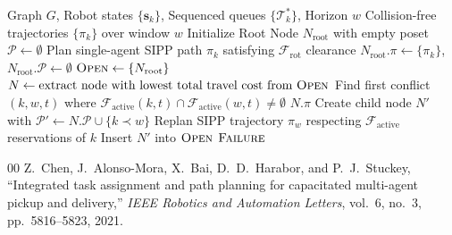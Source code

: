 \documentclass[journal]{IEEEtran}
\begin{document}
\begin{algorithm}[t]
\caption{Priority-Based Search with Swept Clearance (PBS)}
\label{alg:pbs_solver}
\begin{algorithmic}[1]
\REQUIRE Graph $G$, Robot states $\{\mathbf{s}_k\}$, Sequenced queues $\{\mathcal{T}_k^*\}$, Horizon $w$
\ENSURE Collision-free trajectories $\{\pi_k\}$ over window $w$
\STATE Initialize Root Node $N_{\text{root}}$ with empty poset $\mathcal{P} \gets \emptyset$
    \STATE Plan single-agent SIPP path $\pi_k$ satisfying $\mathcal{F}_{\text{rot}}$ clearance
\ENDFOR
\STATE $N_{\text{root}}.\pi \gets \{\pi_k\}$, $N_{\text{root}}.\mathcal{P} \gets \emptyset$
\STATE $\textsc{Open} \gets \{N_{\text{root}}\}$
    \STATE $N \gets \text{extract node with lowest total travel cost from } \textsc{Open}$
    \STATE Find first conflict $(k, w, t)$ where $\mathcal{F}_{\text{active}}(k, t) \cap \mathcal{F}_{\text{active}}(w, t) \neq \emptyset$
        \RETURN $N.\pi$ 
    \ENDIF
        \STATE Create child node $N'$ with $\mathcal{P}' \gets N.\mathcal{P} \cup \{k \prec w\}$
        \STATE Replan SIPP trajectory $\pi_w$ respecting $\mathcal{F}_{\text{active}}$ reservations of $k$
            \STATE Insert $N'$ into $\textsc{Open}$
        \ENDIF
    \ENDFOR
\ENDWHILE
\RETURN $\textsc{Failure}$
\end{algorithmic}
\end{algorithm}

\begin{thebibliography}{00}
Z.~Chen, J.~Alonso-Mora, X.~Bai, D.~D.~Harabor, and P.~J.~Stuckey, ``Integrated task assignment and path planning for capacitated multi-agent pickup and delivery,'' \emph{IEEE Robotics and Automation Letters}, vol.~6, no.~3, pp.~5816--5823, 2021.
\end{thebibliography}
\end{document}
